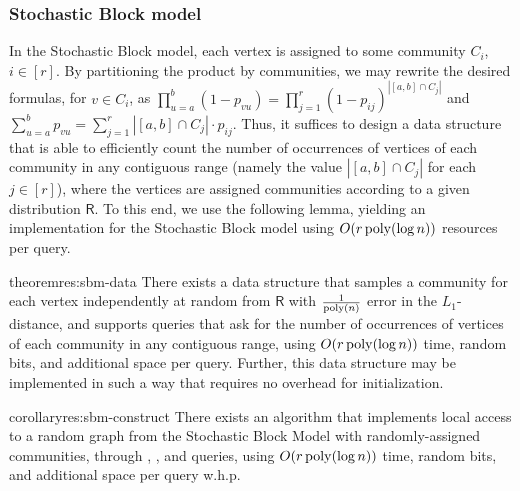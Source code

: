 \subsubsection{Stochastic Block model}
\label{sec:application_sbm}
In the Stochastic Block model, each vertex is assigned to some community $C_i$, $i \in [r]$.
By partitioning the product by communities, we may rewrite the desired formulas, for $v \in C_i$,
as $\prod_{u=a}^b (1-p_{vu}) = \prod_{j=1}^r (1-p_{ij})^{|[a,b]\cap C_j|}$ and $\sum_{u=a}^b p_{vu}=\sum_{j=1}^r |[a,b]\cap C_j|\cdot p_{ij}$.
Thus, it suffices to design a data structure that is able to efficiently count the number of occurrences of vertices of each community
in any contiguous range (namely the value $|[a,b]\cap C_j|$ for each $j \in [r]$),
where the vertices are assigned communities according to a given distribution $\mathsf{R}$.
To this end, we use the following lemma,
yielding an implementation for the Stochastic Block model using $O(r\, \mathrm{poly}(\log n))$ resources per query.

\begin{restatable}{theorem}{res:sbm-data}\label{thm:sbm-data}
There exists a data structure that samples a community for each vertex independently at random from $\mathsf{R}$
with $\frac{1}{\mathrm{poly}(n)}$ error in the $L_1$-distance, and supports queries that ask for the number of occurrences of vertices of each community
in any contiguous range, using $O(r\,\mathrm{poly}(\log n))$ time, random bits, and additional space per query.
Further, this data structure may be implemented in such a way that requires no overhead for initialization.
\end{restatable}
\begin{restatable}{corollary}{res:sbm-construct}\label{cor:sbm-construct}
There exists an algorithm that implements local access to a random graph from the Stochastic Block Model with randomly-assigned communities,
through , , and  queries,
using $O(r\,\mathrm{poly}(\log n))$ time, random bits, and additional space per query w.h.p.
\end{restatable}

